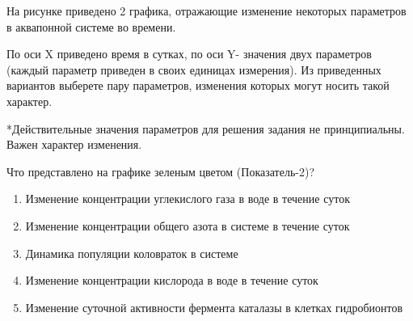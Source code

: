 
На рисунке приведено 2 графика, отражающие изменение некоторых параметров в аквапонной системе во времени.

По оси X приведено время в сутках, по оси Y- значения двух параметров (каждый параметр приведен в своих единицах измерения). Из приведенных вариантов выберете пару параметров, изменения которых могут носить такой характер.


*Действительные значения параметров для решения задания не принципиальны. Важен характер изменения.

Что представлено на графике зеленым цветом (Показатель-2)?

\begin{enumerate}
    \item Изменение концентрации углекислого газа в воде в течение суток
    \item Изменение концентрации общего азота в системе в течение суток
    \item Динамика популяции коловраток в системе
    \item Изменение концентрации кислорода в воде в течение суток
    \item Изменение суточной активности фермента каталазы в клетках гидробионтов
\end{enumerate}